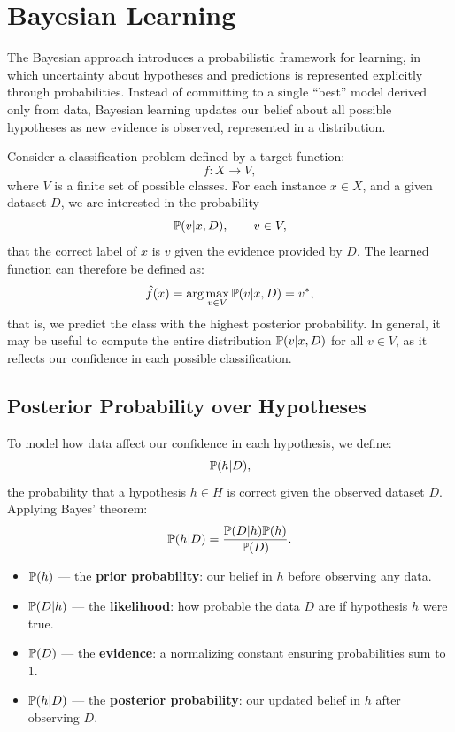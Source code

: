 \documentclass[10pt, letterpaper]{report}
\begin{document}
\section{Bayesian Learning}

The Bayesian approach introduces a probabilistic framework for learning, in which uncertainty about hypotheses and predictions is represented explicitly through probabilities.
Instead of committing to a single “best” model derived only from data, Bayesian learning updates our belief about all possible hypotheses as new evidence is observed, represented in a distribution.

\bigskip
\noindent
Consider a classification problem defined by a target function:
\begin{equation}
	f : X \rightarrow V,
\end{equation}
where $V$ is a finite set of possible classes.
For each instance $x \in X$, and a given dataset $D$, we are interested in the probability
\begin{equation}
	{\mathbb P}(v | x, D), \qquad v \in V,
\end{equation}
that the correct label of $x$ is $v$ given the evidence provided by $D$.
The learned function can therefore be defined as:
\begin{equation}
	\hat f(x) = \arg\max_{v \in V} {\mathbb P}(v | x, D) = v^*,
\end{equation}
that is, we predict the class with the highest posterior probability.
In general, it may be useful to compute the entire distribution ${\mathbb P}(v | x, D)$ for all $v \in V$, as it reflects our confidence in each possible classification.

\bigskip
\subsection{Posterior Probability over Hypotheses}

To model how data affect our confidence in each hypothesis, we define:
\begin{equation}
	{\mathbb P}(h | D),
\end{equation}
the probability that a hypothesis $h \in H$ is correct given the observed dataset $D$.
Applying Bayes’ theorem:
\begin{equation}
	{\mathbb P}(h | D) = \frac{{\mathbb P}(D | h){\mathbb P}(h)}{{\mathbb P}(D)}.
\end{equation}

\begin{itemize}
	\item ${\mathbb P}(h)$ — the \textbf{prior probability}: our belief in $h$ before observing any data.
	\item ${\mathbb P}(D | h)$ — the \textbf{likelihood}: how probable the data $D$ are if hypothesis $h$ were true.
	\item ${\mathbb P}(D)$ — the \textbf{evidence}: a normalizing constant ensuring probabilities sum to $1$.
	\item ${\mathbb P}(h | D)$ — the \textbf{posterior probability}: our updated belief in $h$ after observing $D$.
\end{itemize}
\end{document}
